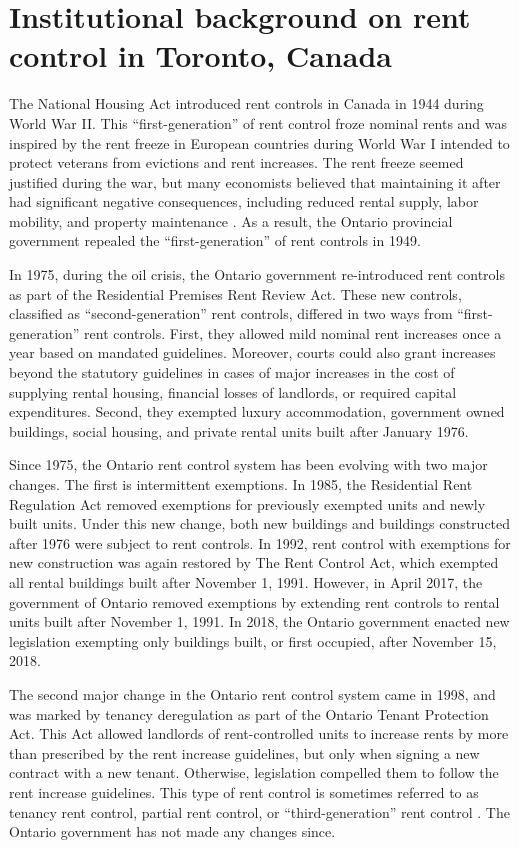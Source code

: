 \documentclass[parskip=full]{article}
\begin{document}
\section{Institutional background on rent control in Toronto, Canada}\label{sec:insitutional_background}
The National Housing Act introduced rent controls in Canada in 1944 during World War II. This “first-generation” of rent control froze nominal rents and was inspired by the rent freeze in European countries during World War I intended to protect veterans from evictions and rent increases. The rent freeze seemed justified during the war, but many economists believed that maintaining it after had significant negative consequences, including reduced rental supply, labor mobility, and property maintenance \citep{arnott-1995}. As a result, the Ontario provincial government repealed the “first-generation” of rent controls in 1949.  

In 1975, during the oil crisis, the Ontario government re-introduced rent controls as part of the Residential Premises Rent Review Act. These new controls, classified as “second-generation” rent controls, differed in two ways from “first-generation” rent controls. First, they allowed mild nominal rent increases once a year based on mandated guidelines. Moreover, courts could also grant increases beyond the statutory guidelines in cases of major increases in the cost of supplying rental housing, financial losses of landlords, or required capital expenditures. Second, they exempted luxury accommodation, government owned buildings, social housing, and private rental units built after January 1976.

Since 1975, the Ontario rent control system has been evolving with two major changes. The first is intermittent exemptions. In 1985, the Residential Rent Regulation Act removed exemptions for previously exempted units and newly built units. Under this new change, both new buildings and buildings constructed after 1976 were subject to rent controls. In 1992, rent control with exemptions for new construction was again restored by The Rent Control Act, which exempted all rental buildings built after November 1, 1991. However, in April 2017, the government of Ontario removed exemptions by extending rent controls to rental units built after November 1, 1991. In 2018, the Ontario government enacted new legislation exempting only buildings built, or first occupied, after November 15, 2018.

The second major change in the Ontario rent control system came in 1998, and was marked by tenancy deregulation as part of the Ontario Tenant Protection Act. This Act allowed landlords of rent-controlled units to increase rents by more than prescribed by the rent increase guidelines, but only when signing a new contract with a new tenant. Otherwise, legislation compelled them to follow the rent increase guidelines. This type of rent control is sometimes referred to as tenancy rent control, partial rent control, or “third-generation” rent control \citep{arnott-2003}. The Ontario government has not made any changes since. 
\end{document}
